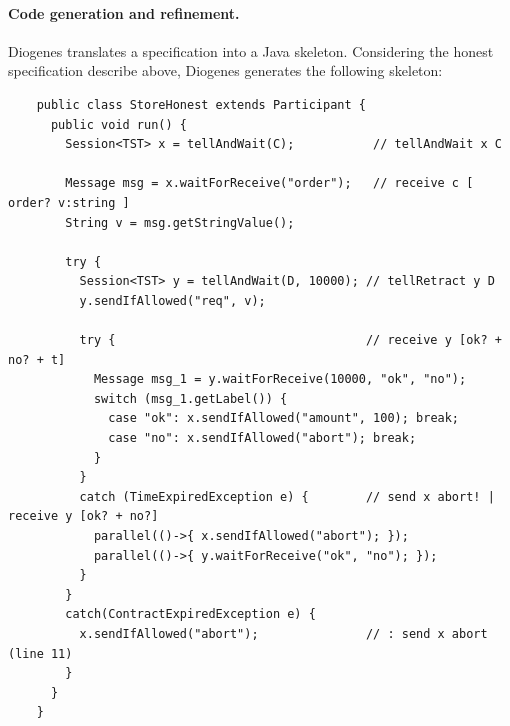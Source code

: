 \paragraph{Code generation and refinement.}
Diogenes translates a \coco specification
into a Java skeleton.
Considering the honest specification describe above,
Diogenes generates the following skeleton:
\begin{mdframed}
  \begin{verbatim}
    public class StoreHonest extends Participant { 
      public void run() {
        Session<TST> x = tellAndWait(C);           // tellAndWait x C
        
        Message msg = x.waitForReceive("order");   // receive c [ order? v:string ]
        String v = msg.getStringValue();
        
        try {
          Session<TST> y = tellAndWait(D, 10000); // tellRetract y D
          y.sendIfAllowed("req", v);
          
          try {                                   // receive y [ok? + no? + t]
            Message msg_1 = y.waitForReceive(10000, "ok", "no");
            switch (msg_1.getLabel()) {                    
              case "ok": x.sendIfAllowed("amount", 100); break;
              case "no": x.sendIfAllowed("abort"); break;                    
            }
          }
          catch (TimeExpiredException e) {        // send x abort! | receive y [ok? + no?] 
            parallel(()->{ x.sendIfAllowed("abort"); });
            parallel(()->{ y.waitForReceive("ok", "no"); });
          }            
        }
        catch(ContractExpiredException e) {
          x.sendIfAllowed("abort");               // : send x abort (line 11)
        } 
      }
    }
  \end{verbatim}
\end{mdframed}



